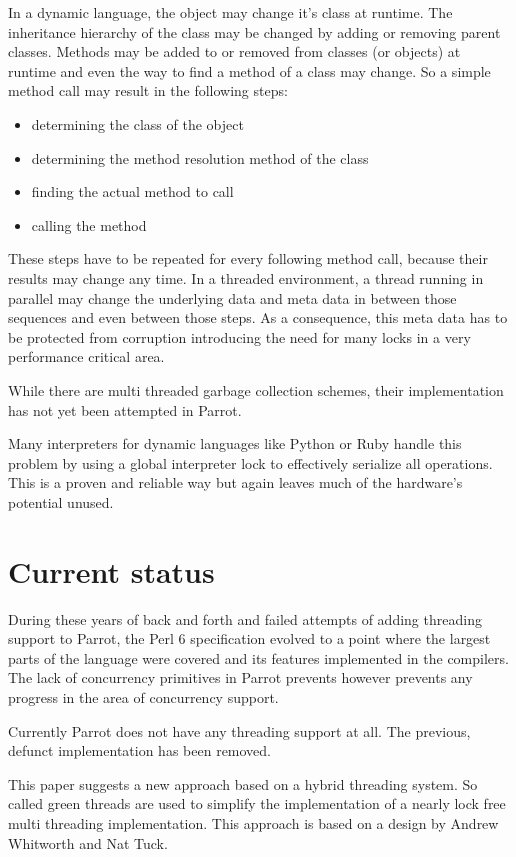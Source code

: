 \documentclass[bachelor,english]{hgbthesis}
\begin{document}
In a dynamic language, the object may change it's class at runtime. The inheritance hierarchy of the class may be changed by adding or removing parent classes. Methods may be added to or removed from classes (or objects) at runtime and even the way to find a method of a class may change. So a simple method call may result in the following steps:
%
\begin{itemize}
\item determining the class of the object
\item determining the method resolution method of the class
\item finding the actual method to call
\item calling the method
\end{itemize}
%
These steps have to be repeated for every following method call, because their results may change any time. In a threaded environment, a thread running in parallel may change the underlying data and meta data in between those sequences and even between those steps. As a consequence, this meta data has to be protected from corruption introducing the need for many locks in a very performance critical area.

While there are multi threaded garbage collection schemes, their implementation has not yet been attempted in Parrot.

Many interpreters for dynamic languages like Python or Ruby handle this problem by using a global interpreter lock to effectively serialize all operations. This is a proven and reliable way but again leaves much of the hardware's potential unused.

\section{Current status}

During these years of back and forth and failed attempts of adding threading support to Parrot, the Perl 6 specification evolved to a point where the largest parts of the language were covered and its features implemented in the compilers. The lack of concurrency primitives in Parrot prevents however prevents any progress in the area of concurrency support.

Currently Parrot does not have any threading support at all. The previous, defunct implementation has been removed.

This paper suggests a new approach based on a hybrid threading system. So called green threads are used to simplify the implementation of a nearly lock free multi threading implementation. This approach is based on a design by Andrew Whitworth and Nat Tuck.
\end{document}
